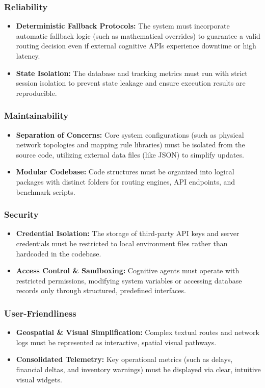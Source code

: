 \subsubsection{Reliability}
\begin{itemize}
    \item \textbf{Deterministic Fallback Protocols:} The system must incorporate automatic fallback logic (such as mathematical overrides) to guarantee a valid routing decision even if external cognitive APIs experience downtime or high latency.
    \item \textbf{State Isolation:} The database and tracking metrics must run with strict session isolation to prevent state leakage and ensure execution results are reproducible.
\end{itemize}

\subsubsection{Maintainability}
\begin{itemize}
    \item \textbf{Separation of Concerns:} Core system configurations (such as physical network topologies and mapping rule libraries) must be isolated from the source code, utilizing external data files (like JSON) to simplify updates.
    \item \textbf{Modular Codebase:} Code structures must be organized into logical packages with distinct folders for routing engines, API endpoints, and benchmark scripts.
\end{itemize}

\subsubsection{Security}
\begin{itemize}
    \item \textbf{Credential Isolation:} The storage of third-party API keys and server credentials must be restricted to local environment files rather than hardcoded in the codebase.
    \item \textbf{Access Control \& Sandboxing:} Cognitive agents must operate with restricted permissions, modifying system variables or accessing database records only through structured, predefined interfaces.
\end{itemize}

\subsubsection{User-Friendliness}
\begin{itemize}
    \item \textbf{Geospatial \& Visual Simplification:} Complex textual routes and network logs must be represented as interactive, spatial visual pathways.
    \item \textbf{Consolidated Telemetry:} Key operational metrics (such as delays, financial deltas, and inventory warnings) must be displayed via clear, intuitive visual widgets.
\end{itemize}


